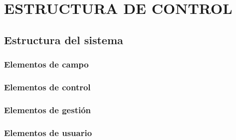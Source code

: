 \chapter{ESTRUCTURA DE CONTROL}
\thispagestyle{empty}

\section{Estructura del sistema}
\subsection{Elementos de campo}
\subsection{Elementos de control}
\subsection{Elementos de gestión}
\subsection{Elementos de usuario}